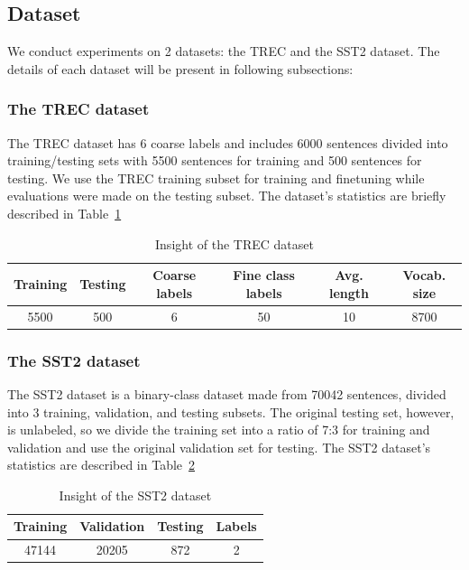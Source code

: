 \documentclass[sn-mathphys,Numbered]{sn-jnl}%
\theoremstyle{thmstyleone}%
\theoremstyle{thmstyletwo}%
\theoremstyle{thmstylethree}%
\begin{document}
\subsection{Dataset}
We conduct experiments on 2 datasets: the TREC and the SST2 dataset. The details of each dataset will be present in following subsections:

\subsubsection{The TREC dataset}
The TREC dataset\cite{hovy2001, li2002} has 6 coarse labels and includes 6000 sentences divided into training/testing sets with 5500 sentences for training and 500 sentences for testing. We use the TREC training subset for training and finetuning while evaluations were made on the testing subset. The dataset’s statistics are briefly described in Table~\ref{tab:trec-insight}

\begin{table}[htp]
\centering
\caption{Insight of the TREC dataset} \label{tab:trec-insight}
\begin{tabular*}{\textwidth}{@{\extracolsep\fill}cccccc}
\toprule
\textbf{Training} & \textbf{Testing} & \textbf{Coarse labels} & \textbf{Fine class labels} & \textbf{Avg. length} & \textbf{Vocab. size} \\ \midrule
5500              & 500              & 6                      & 50                         & 10                   & 8700                 \\ \bottomrule
\end{tabular*}
\end{table}

\subsubsection{The SST2 dataset}
The SST2 dataset\cite{Socher2013} is a binary-class dataset made from 70042 sentences, divided into 3 training, validation, and testing subsets. The original testing set, however, is unlabeled, so we divide the training set into a ratio of 7:3 for training and validation and use the original validation set for testing. The SST2 dataset’s statistics are described in Table~\ref{tab:sst2-insight}

\begin{table}[htp]
\centering
\caption{Insight of the SST2 dataset} \label{tab:sst2-insight}
\begin{tabular*}{\textwidth}{@{\extracolsep\fill}cccc}
\toprule
\textbf{Training} & \textbf{Validation} & \textbf{Testing} & \textbf{Labels} \\ \midrule
47144              & 20205              & 872                      & 2 \\ \bottomrule
\end{tabular*}
\end{table}
\end{document}
